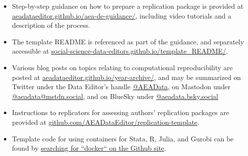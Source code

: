 \begin{itemize}
    \item Step-by-step guidance on how to prepare a replication package is provided at \href{https://aeadataeditor.github.io/aea-de-guidance/}{aeadataeditor.github.io/aea-de-guidance/}, including video tutorials and a description of the process. 
    \item The template README \citep{READMEv1.1.0} is referenced as part of the guidance, and separately accessible at \href{https://social-science-data-editors.github.io/template_README/}{social-science-data-editors.github.io/template\_README/}.
    \item Various blog posts on topics relating to computational reproducibility are posted at \href{https://aeadataeditor.github.io/year-archive/}{aeadataeditor.github.io/year-archive/}, and may be summarized on Twitter under the Data Editor's handle \href{https://twitter.com/AEAData}{@AEAData},  on Mastodon under \href{https://mstdn.social/@aeadata}{@aeadata@mstdn.social}, and on BlueSky under \href{https://bsky.app/profile/aeadata.bsky.social}{@aeadata.bsky.social}
    \item Instructions to replicators for assessing authors' replication packages are provided at \href{https://github.com/AEADataEditor/replication-template}{github.com/AEADataEditor/replication-template}.
    \item Template code for using containers for Stata, R, Julia, and Gurobi can be found by \href{https://github.com/AEADataEditor?q=docker&type=all&language=&sort=}{searching for ``docker`` on the Github site}.
    
\end{itemize}
